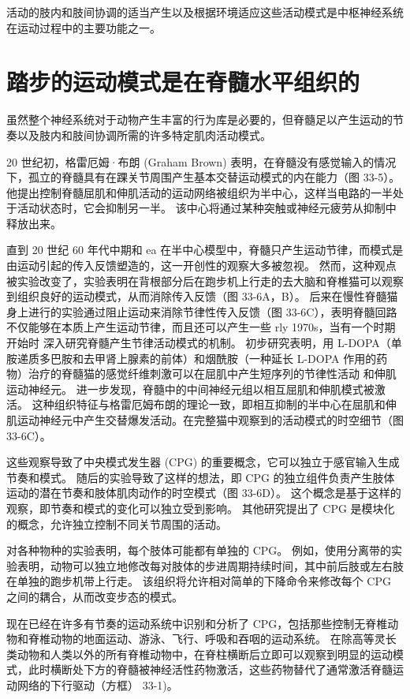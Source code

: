 活动的肢内和肢间协调的适当产生以及根据环境适应这些活动模式是中枢神经系统在运动过程中的主要功能之一。


\section{踏步的运动模式是在脊髓水平组织的}
虽然整个神经系统对于动物产生丰富的行为库是必要的，但脊髓足以产生运动的节奏以及肢内和肢间协调所需的许多特定肌肉活动模式。

20 世纪初，格雷厄姆·布朗 (Graham Brown) 表明，在脊髓没有感觉输入的情况下，孤立的脊髓具有在踝关节周围产生基本交替运动模式的内在能力（图 33-5）。 他提出控制脊髓屈肌和伸肌活动的运动网络被组织为半中心，这样当电路的一半处于活动状态时，它会抑制另一半。 该中心将通过某种突触或神经元疲劳从抑制中释放出来。

直到 20 世纪 60 年代中期和 ea 在半中心模型中，脊髓只产生运动节律，而模式是由运动引起的传入反馈塑造的，这一开创性的观察大多被忽视。 然而，这种观点被实验改变了，实验表明在背根部分后在跑步机上行走的去大脑和脊椎猫可以观察到组织良好的运动模式，从而消除传入反馈（图 33-6A，B）。 后来在慢性脊髓猫身上进行的实验通过阻止运动来消除节律性传入反馈（图 33-6C），表明脊髓回路不仅能够在本质上产生运动节律，而且还可以产生一些 rly 1970s，当有一个时期开始时 深入研究脊髓产生节律活动模式的机制。 初步研究表明，用 L-DOPA（单胺递质多巴胺和去甲肾上腺素的前体）和烟酰胺（一种延长 L-DOPA 作用的药物）治疗的脊髓猫的感觉纤维刺激可以在屈肌中产生短序列的节律性活动 和伸肌运动神经元。 进一步发现，脊髓中的中间神经元组以相互屈肌和伸肌模式被激活。 这种组织特征与格雷厄姆布朗的理论一致，即相互抑制的半中心在屈肌和伸肌运动神经元中产生交替爆发活动。在完整猫中观察到的活动模式的时空细节（图 33-6C）。

这些观察导致了中央模式发生器 (CPG) 的重要概念，它可以独立于感官输入生成节奏和模式。 随后的实验导致了这样的想法，即 CPG 的独立组件负责产生肢体运动的潜在节奏和肢体肌肉动作的时空模式（图 33-6D）。 这个概念是基于这样的观察，即节奏和模式的变化可以独立受到影响。 其他研究提出了 CPG 是模块化的概念，允许独立控制不同关节周围的活动。

对各种物种的实验表明，每个肢体可能都有单独的 CPG。 例如，使用分离带的实验表明，动物可以独立地修改每对肢体的步进周期持续时间，其中前后肢或左右肢在单独的跑步机带上行走。 该组织将允许相对简单的下降命令来修改每个 CPG 之间的耦合，从而改变步态的模式。

现在已经在许多有节奏的运动系统中识别和分析了 CPG，包括那些控制无脊椎动物和脊椎动物的地面运动、游泳、飞行、呼吸和吞咽的运动系统。 在除高等灵长类动物和人类以外的所有脊椎动物中，在脊柱横断后立即可以观察到明显的运动模式，此时横断处下方的脊髓被神经活性药物激活，这些药物替代了通常激活脊髓运动网络的下行驱动（方框） 33-1)。

